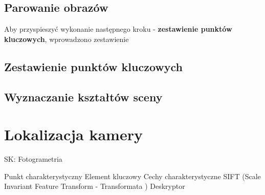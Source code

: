 \subsection{Parowanie obrazów}
Aby przyspieszyć wykonanie następnego kroku - \textbf{zestawienie punktów kluczowych}, wprowadzono zestawienie
\subsection{Zestawienie punktów kluczowych}
\subsection{Wyznaczanie kształtów sceny}
\section{Lokalizacja kamery}




SK:
Fotogrametria

Punkt charakterystyczny
Element kluczowy
Cechy charakterystyczne
SIFT (Scale Invariant Feature Transform - Transformata )
Deskryptor
